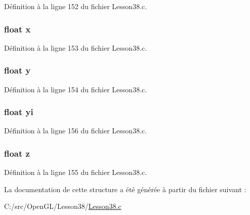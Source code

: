Définition à la ligne 152 du fichier Lesson38.\+c.

\subsubsection[{\texorpdfstring{x}{x}}]{\setlength{\rightskip}{0pt plus 5cm}float x}\hypertarget{struct___o_b_j_e_c_t_ad0da36b2558901e21e7a30f6c227a45e}{}\label{struct___o_b_j_e_c_t_ad0da36b2558901e21e7a30f6c227a45e}


Définition à la ligne 153 du fichier Lesson38.\+c.

\subsubsection[{\texorpdfstring{y}{y}}]{\setlength{\rightskip}{0pt plus 5cm}float y}\hypertarget{struct___o_b_j_e_c_t_aa4f0d3eebc3c443f9be81bf48561a217}{}\label{struct___o_b_j_e_c_t_aa4f0d3eebc3c443f9be81bf48561a217}


Définition à la ligne 154 du fichier Lesson38.\+c.

\subsubsection[{\texorpdfstring{yi}{yi}}]{\setlength{\rightskip}{0pt plus 5cm}float yi}\hypertarget{struct___o_b_j_e_c_t_a2700b8bdea86358af21700a5694ed3a9}{}\label{struct___o_b_j_e_c_t_a2700b8bdea86358af21700a5694ed3a9}


Définition à la ligne 156 du fichier Lesson38.\+c.

\subsubsection[{\texorpdfstring{z}{z}}]{\setlength{\rightskip}{0pt plus 5cm}float z}\hypertarget{struct___o_b_j_e_c_t_af73583b1e980b0aa03f9884812e9fd4d}{}\label{struct___o_b_j_e_c_t_af73583b1e980b0aa03f9884812e9fd4d}


Définition à la ligne 155 du fichier Lesson38.\+c.



La documentation de cette structure a été générée à partir du fichier suivant \+:\begin{DoxyCompactItemize}
\item 
C\+:/src/\+Open\+G\+L/\+Lesson38/\hyperlink{_lesson38_8c}{Lesson38.\+c}\end{DoxyCompactItemize}
